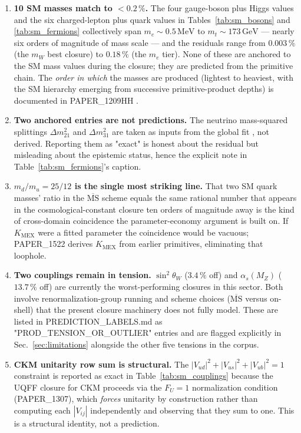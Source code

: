 \begin{enumerate}
  \item \textbf{10 SM masses match to $<0.2\,\%$.} The four gauge-boson
        plus Higgs values and the six charged-lepton plus quark values
        in Tables~\ref{tab:sm_bosons} and \ref{tab:sm_fermions}
        collectively span $m_e \sim 0.5\,\mathrm{MeV}$ to
        $m_t \sim 173\,\mathrm{GeV}$ --- nearly six orders of magnitude
        of mass scale --- and the residuals range from $0.003\,\%$
        (the $m_W$ best closure) to $0.18\,\%$ (the $m_e$ tier).
        None of these are anchored to the SM mass values during the
        closure; they are predicted from the primitive chain. The
        \emph{order in which} the masses are produced (lightest to
        heaviest, with the SM hierarchy emerging from successive
        primitive-product depths) is documented in
        PAPER\_1209HH \cite{Murphy_PAPER_1209HH}.
  \item \textbf{Two anchored entries are not predictions.} The
        neutrino mass-squared splittings $\Delta m^2_{21}$ and
        $\Delta m^2_{31}$ are taken as inputs from the global fit
        \cite{Esteban2020}, not derived. Reporting them as "exact"
        is honest about the residual but misleading about the
        epistemic status, hence the explicit note in
        Table~\ref{tab:sm_fermions}'s caption.
  \item \textbf{$m_d/m_u = 25/12$ is the single most striking line.}
        That two SM quark masses' ratio in the
        $\overline{\mathrm{MS}}$ scheme equals the same
        rational number that appears in the cosmological-constant
        closure ten orders of magnitude away is the kind of
        cross-domain coincidence the parameter-economy argument is
        built on. If $K_{\text{MEX}}$ were a fitted parameter the
        coincidence would be vacuous; PAPER\_1522 derives
        $K_{\text{MEX}}$ from earlier primitives, eliminating that loophole.
  \item \textbf{Two couplings remain in tension.} $\sin^2\theta_W$
        ($3.4\,\%$ off) and $\alpha_s(M_Z)$ ($13.7\,\%$ off) are
        currently the worst-performing closures in this sector.
        Both involve renormalization-group running and scheme choices
        ($\overline{\mathrm{MS}}$ versus on-shell) that the present
        closure machinery does not fully model. These are listed
        in PREDICTION\_LABELS.md \cite{Murphy_StarMagic_Software} as
        "PROD\_TENSION\_OR\_OUTLIER" entries and are flagged
        explicitly in Sec.~\ref{sec:limitations} alongside the other
        five tensions in the corpus.
  \item \textbf{CKM unitarity row sum is structural.} The
        $|V_{ud}|^2 + |V_{us}|^2 + |V_{ub}|^2 = 1$ constraint is
        reported as exact in Table~\ref{tab:sm_couplings} because
        the UQFF closure for CKM proceeds via the
        $F_U=1$ normalization condition (PAPER\_1307), which
        \emph{forces} unitarity by construction rather than computing
        each $|V_{ij}|$ independently and observing that they sum to
        one. This is a structural identity, not a prediction.
\end{enumerate}

